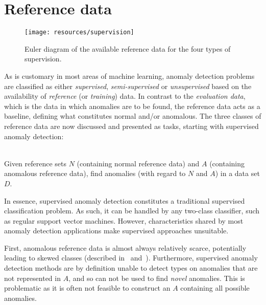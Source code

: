 \clearpage

\section{Reference data}
\label{sect:reference_data}

\begin{wrapfigure}{r}{0.5\textwidth}
    \vspace{-25pt}
    \begin{center}
        \leavevmode
        \texttt{[image: resources/supervision]}
    \end{center}
    \caption{{\small Euler diagram of the available reference data for the four types of supervision.}}
\label{fig:supervision}
    \vspace{-40pt}
\end{wrapfigure}

As is customary in most areas of machine learning, anomaly detection problems are classified as either \emph{supervised}, \emph{semi-supervised} or \emph{unsupervised} based on the availability of \emph{reference} (or \emph{training}) data. In contrast to the \emph{evaluation data}, which is the data in which anomalies are to be found, the reference data acts as a baseline, defining what constitutes normal and/or anomalous. The three classes of reference data are now discussed and presented as tasks, starting with supervised anomaly detection:

\begin{task}
\label{task:supervised}\ \\
    Given reference sets $N$ (containing normal reference data) and $A$ (containing anomalous reference data), find anomalies (with regard to $N$ and $A$) in a data set $D$.
\end{task}
In essence, supervised anomaly detection constitutes a traditional supervised classification problem. As such, it can be handled by any two-class classifier, such as regular support vector machines. However, characteristics shared by most anomaly detection applications make supervised approaches unsuitable.

First, anomalous reference data is almost always relatively scarce, potentially leading to skewed classes (described in~\cite{phua} and~\cite{joshi}). Furthermore, supervised anomaly detection methods are by definition unable to detect types on anomalies that are not represented in $A$, and so can not be used to find \emph{novel} anomalies. This is problematic as it is often not feasible to construct an $A$ containing all possible anomalies.

